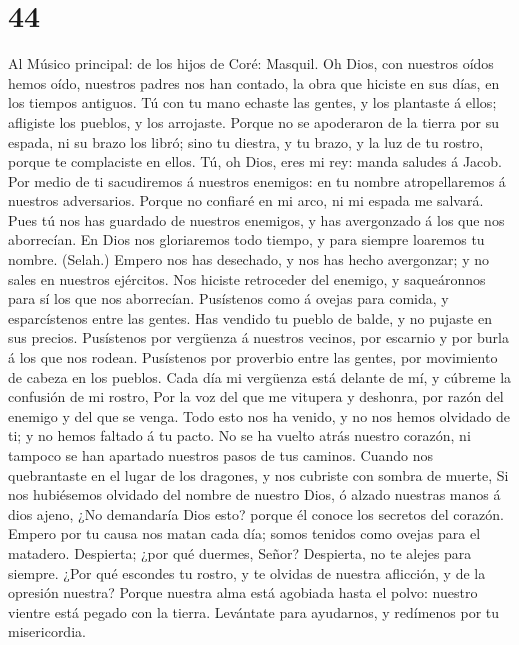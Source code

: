 \hypertarget{section-43}{%
\section{44}\label{section-43}}

 Al Músico principal: de los hijos de Coré: Masquil. Oh
Dios, con nuestros oídos hemos oído, nuestros padres nos han contado, la
obra que hiciste en sus días, en los tiempos antiguos.  Tú
con tu mano echaste las gentes, y los plantaste á ellos; afligiste los
pueblos, y los arrojaste.  Porque no se apoderaron de la
tierra por su espada, ni su brazo los libró; sino tu diestra, y tu
brazo, y la luz de tu rostro, porque te complaciste en ellos.
 Tú, oh Dios, eres mi rey: manda saludes á Jacob.
 Por medio de ti sacudiremos á nuestros enemigos: en tu
nombre atropellaremos á nuestros adversarios.  Porque no
confiaré en mi arco, ni mi espada me salvará.  Pues tú nos
has guardado de nuestros enemigos, y has avergonzado á los que nos
aborrecían.  En Dios nos gloriaremos todo tiempo, y para
siempre loaremos tu nombre. (Selah.)  Empero nos has
desechado, y nos has hecho avergonzar; y no sales en nuestros ejércitos.
 Nos hiciste retroceder del enemigo, y saqueáronnos para
sí los que nos aborrecían.  Pusístenos como á ovejas para
comida, y esparcístenos entre las gentes.  Has vendido tu
pueblo de balde, y no pujaste en sus precios.  Pusístenos
por vergüenza á nuestros vecinos, por escarnio y por burla á los que nos
rodean.  Pusístenos por proverbio entre las gentes, por
movimiento de cabeza en los pueblos.  Cada día mi
vergüenza está delante de mí, y cúbreme la confusión de mi rostro,
 Por la voz del que me vitupera y deshonra, por razón del
enemigo y del que se venga.  Todo esto nos ha venido, y
no nos hemos olvidado de ti; y no hemos faltado á tu pacto.
 No se ha vuelto atrás nuestro corazón, ni tampoco se han
apartado nuestros pasos de tus caminos.  Cuando nos
quebrantaste en el lugar de los dragones, y nos cubriste con sombra de
muerte,  Si nos hubiésemos olvidado del nombre de nuestro
Dios, ó alzado nuestras manos á dios ajeno,  ¿No
demandaría Dios esto? porque él conoce los secretos del corazón.
 Empero por tu causa nos matan cada día; somos tenidos
como ovejas para el matadero.  Despierta; ¿por qué
duermes, Señor? Despierta, no te alejes para siempre. 
¿Por qué escondes tu rostro, y te olvidas de nuestra aflicción, y de la
opresión nuestra?  Porque nuestra alma está agobiada
hasta el polvo: nuestro vientre está pegado con la tierra.
 Levántate para ayudarnos, y redímenos por tu
misericordia.

